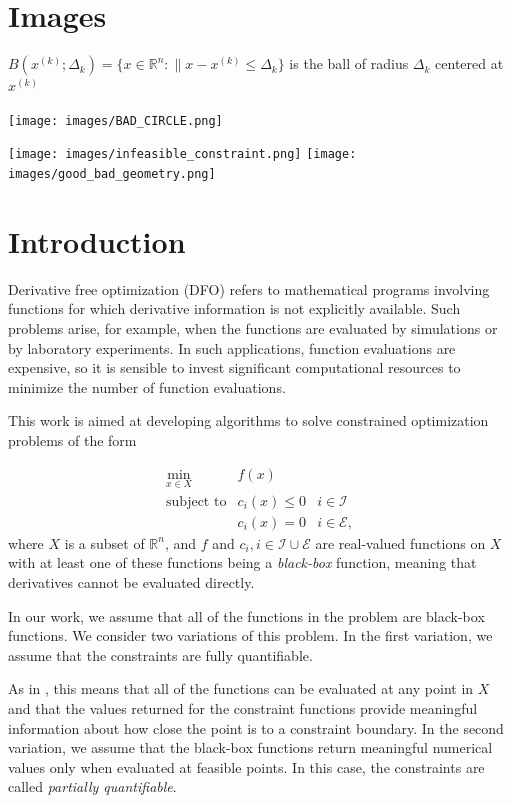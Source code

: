 \documentclass{article}
\newcommand{\domain}{X}
\newcommand{\real}{\mathbb R}
\begin{document}
\section{Images}
 $B(x^{(k)};\Delta_k) = \{ x \in \mathbb{R}^n : \| x - x^{(k)} \le \Delta_k \}$ 
		is the ball of radius $\Delta_k$ centered at $x^{(k)}$

\texttt{[image: images/BAD\_CIRCLE.png]}

\texttt{[image: images/infeasible\_constraint.png]}
\texttt{[image: images/good\_bad\_geometry.png]}







\section{Introduction}

Derivative free optimization (DFO) refers to mathematical programs involving functions for which derivative information is not explicitly available.
Such problems arise, for example, when the functions are evaluated by simulations or by laboratory experiments.
In such applications, function evaluations are expensive, so it is sensible to invest significant computational resources to minimize the number of function evaluations.

This work is aimed at developing algorithms to solve constrained optimization problems of the form 

\[ \begin{array}{ccl} \min_{x \in \domain} & f(x) \\
\mbox{subject to} & c_i(x) \le 0 & i \in \mathcal{I} \\
& c_i(x) = 0 & i \in \mathcal{E},
\end{array}
\]
where $\domain$ is a subset of $\real^n$, and $f$ and $c_i, i \in \mathcal{I} \cup \mathcal{E}$ are real-valued functions on $X$ with at least one of these functions being a {\em black-box} function, meaning that derivatives cannot be evaluated directly.  

In our work, we assume that all of the functions in the problem are black-box functions.
We consider two variations of this problem.
In the first variation, we assume that the constraints are fully quantifiable.


As in \cite{DUMMY:typesofconstraints}, this means that all of the functions can be evaluated at any point in $X$ and that the values returned for the constraint functions provide meaningful information about how close the point is to a constraint boundary.
In the second variation, we assume that the black-box functions return meaningful numerical values only when evaluated at feasible points. In this case, the constraints are called {\em partially quantifiable}.   
\end{document}
